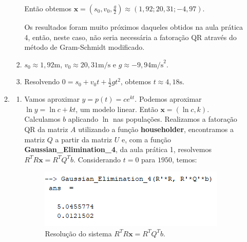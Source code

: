 \documentclass[11pt]{article}
\begin{document}
\begin{enumerate}
\begin{enumerate}[label=\arabic*)]
\begin{enumerate}[label=\alph*)]
                    Então obtemos $\mathbf{x} = (s_0, v_0, \frac{g}{2}) \approx (1,92; 20,31; -4,97)$.
                    
                    Os resultados foram muito próximos daqueles obtidos na aula prática 4, então, neste caso, não seria necessária a fatoração QR através do método de Gram-Schmidt modificado.
                    
                    \bigbreak
                    
                    \item $s_0 \approx 1,92 \textrm{m}$, $v_0 \approx 20,31\textrm{m/s}$ e $g \approx -9,94 \textrm{m/s}^2$.
                    
                    \bigbreak
                    
                    \item Resolvendo $0 = s_0 + v_0t + \frac{1}{2}gt^2$, obtemos $t\approx 4,18 \textrm{s}$.
                    
                \bigbreak
                \end{enumerate}
                
                \item
                
                \begin{enumerate}[label=\alph*)]
                    \item Vamos aproximar $y = p(t) = ce^{kt}$. Podemos aproximar $\ln y = \ln c + kt$, um modelo linear. Então $\mathbf{x} = (\ln c, k)$. Calculamos $b$ aplicando $\ln$ nas populações. Realizamos a fatoração QR da matriz $A$ utilizando a função \textbf{householder}, encontramos a matriz $Q$ a partir da matriz $U$ e, com a função \textbf{Gaussian\_Elimination\_4}, da aula prática 1, resolvemos $R^TR\mathbf{x} = R^TQ^Tb$. Considerando $t=0$ para $1950$, temos:
                
                    \begin{figure}[H]
                        \centering
                        \includegraphics[]{4-2}
                        \caption{Resolução do sistema $R^TR\mathbf{x} = R^TQ^Tb$.}
                    \end{figure}
                    

\end{enumerate}
\end{enumerate}
\end{enumerate}
\end{document}
